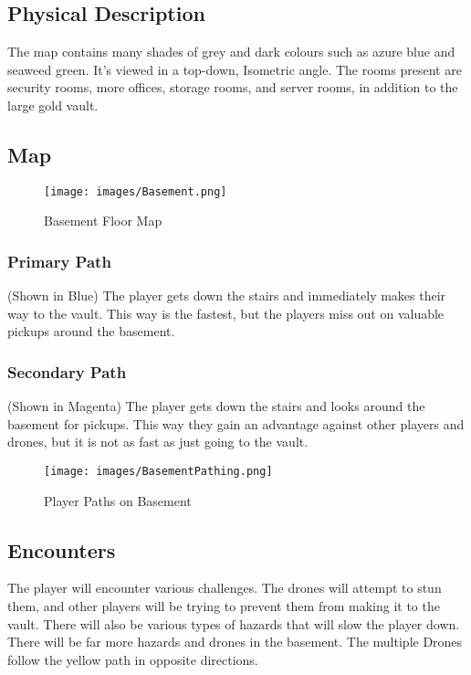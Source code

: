 \documentclass[10pt]{report}
\begin{document}
\subsection{Physical Description}

The map contains many shades of grey and dark colours such as azure blue and seaweed green. It’s viewed in a top-down, Isometric angle. The rooms present are security rooms, more offices, storage rooms, and server rooms, in addition to the large gold vault.

\subsection{Map}

\begin{figure}[H]
    \centering
    \texttt{[image: images/Basement.png]}
    \caption{Basement Floor Map}
\end{figure}

\subsubsection{Primary Path}

(Shown in Blue) The player gets down the stairs and immediately makes their way to the vault. This way is the fastest, but the players miss out on valuable pickups around the basement.

\subsubsection{Secondary Path}

(Shown in Magenta) The player gets down the stairs and looks around the basement for pickups. This way they gain an advantage against other players and drones, but it is not as fast as just going to the vault.


\begin{figure}[H]
    \centering
    \texttt{[image: images/BasementPathing.png]}
    \caption{Player Paths on Basement}
\end{figure}

\subsection{Encounters}

The player will encounter various challenges. The drones will attempt to stun them, and other players will be trying to prevent them from making it to the vault. There will also be various types of hazards that will slow the player down. There will be far more hazards and drones in the basement. The multiple Drones follow the yellow path in opposite directions.
\end{document}
